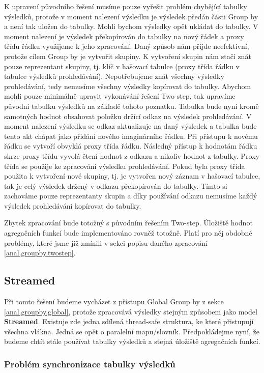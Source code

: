 K upravení původního řešení musíme pouze vyřešit problém chybějící tabulky výsledků, protože v moment nalezení výsledku je výsledek předán části Group by a není tak uložen do tabulky.
Mohli bychom výsledky opět ukládat do tabulky.
V moment nalezení je výsledek překopírován do tabulky na nový řádek a proxy třídu řádku využijeme k jeho zpracování.
Daný způsob nám příjde neefektivní, protože cílem Group by je vytvořit skupiny. 
K vytvoření skupin nám stačí znát pouze reprezentant skupiny, tj. klíč v hašovací tabulce (proxy třída řádku v tabulce výsledků prohledávání).
Nepotřebujeme znát všechny výsledky prohledávání, tedy nemusíme všechny výsledky kopírovat do tabulky.
Abychom mohli pouze minimálně upravit vykonávání řešení Two-step, tak upravíme původní tabulku výsledků na základě tohoto poznatku.
Tabulka bude nyní kromě samotných hodnot obsahovat položku držící odkaz na výsledek prohledávání.
V moment nalezení výsledku se odkaz aktualizuje na daný výsledek a tabulka bude tento akt chápat jako přidání nového imaginárního řádku.
Při přístupu k novému řádku se vytvoří obvyklá proxy třída řádku.
Následný přístup k hodnotám řádku skrze proxy třídu vyvolá čtení hodnot z odkazu a nikoliv hodnot z tabulky.
Proxy třída se použije ke zpracování výsledku prohledávání.
Pokud byla proxy třída použita k vytvoření nové skupiny, tj. je vytvořen nový záznam v hašovací tabulce, tak je celý výsledek držený v odkazu překopírován do tabulky.
Tímto si zachováme pouze reprezentanty skupin a díky používání odkazu nemusíme každý výsledek prohledávání kopírovat do tabulky.

Zbytek zpracování bude totožný s původním řešením Two-step.
Úložiště hodnot agregačních funkcí bude implementováno rovněž totožně.
Platí pro něj obdobné problémy, které jsme již zmínili v sekci popisu daného zpracování \ref{anal.groupby.twostep}. 

\subsection{Streamed}

Při tomto řešení budeme vycházet z přístupu Global Group by z sekce \ref{anal.groupby.global}, protože zpracovává výsledky stejným způsobem jako model \textbf{Streamed}.
Existuje zde jedna sdílená thread-safe struktura, ke které přistupují všechna vlákna.
Jedná se opět o paralelní mapu/slovník.
Předpokládejme nyní, že budeme chtít stále používat tabulky výsledků a stejná úložiště agregačních funkcí.

\subsubsection{Problém synchronizace tabulky výsledků}

